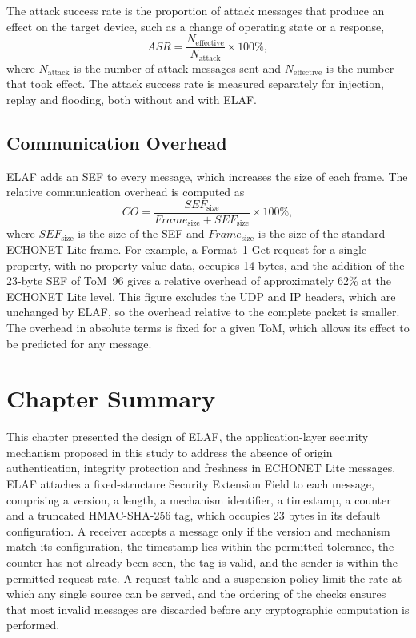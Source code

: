 The attack success rate is the proportion of attack messages that produce an effect on the target device, such as a change of operating state or a response,
\begin{equation}
  ASR = \frac{N_{\mathrm{effective}}}{N_{\mathrm{attack}}} \times 100\% ,
  \label{eq:asr}
\end{equation}
where $N_{\mathrm{attack}}$ is the number of attack messages sent and $N_{\mathrm{effective}}$ is the number that took effect. The attack success rate is measured separately for injection, replay and flooding, both without and with ELAF.

\subsection{Communication Overhead}

ELAF adds an SEF to every message, which increases the size of each frame. The relative communication overhead is computed as
\begin{equation}
  CO = \frac{SEF_{\mathrm{size}}}{Frame_{\mathrm{size}} + SEF_{\mathrm{size}}} \times 100\% ,
  \label{eq:co}
\end{equation}
where $SEF_{\mathrm{size}}$ is the size of the SEF and $Frame_{\mathrm{size}}$ is the size of the standard ECHONET Lite frame. For example, a Format~1 Get request for a single property, with no property value data, occupies 14 bytes, and the addition of the 23-byte SEF of ToM~96 gives a relative overhead of approximately 62\% at the ECHONET Lite level. This figure excludes the UDP and IP headers, which are unchanged by ELAF, so the overhead relative to the complete packet is smaller. The overhead in absolute terms is fixed for a given ToM, which allows its effect to be predicted for any message.

\section{Chapter Summary}
\label{sec:m-summary}

This chapter presented the design of ELAF, the application-layer security mechanism proposed in this study to address the absence of origin authentication, integrity protection and freshness in ECHONET Lite messages. ELAF attaches a fixed-structure Security Extension Field to each message, comprising a version, a length, a mechanism identifier, a timestamp, a counter and a truncated HMAC-SHA-256 tag, which occupies 23 bytes in its default configuration. A receiver accepts a message only if the version and mechanism match its configuration, the timestamp lies within the permitted tolerance, the counter has not already been seen, the tag is valid, and the sender is within the permitted request rate. A request table and a suspension policy limit the rate at which any single source can be served, and the ordering of the checks ensures that most invalid messages are discarded before any cryptographic computation is performed.

